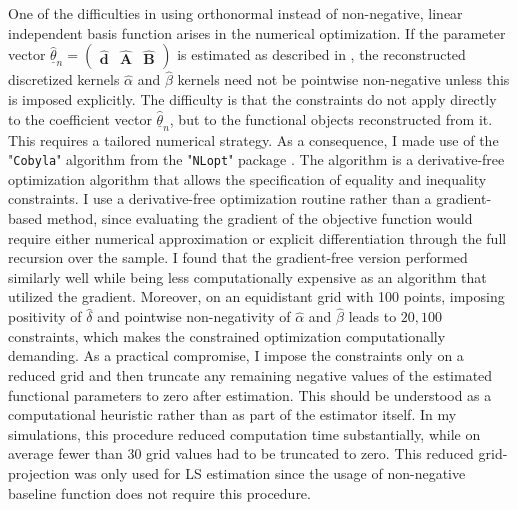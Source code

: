 \documentclass[12pt,a4paper]{article}
\theoremstyle{definition}
\begin{document}
One of the difficulties in using orthonormal instead of non-negative, linear independent basis function arises in the numerical optimization. If the parameter vector $\hat{\underline{\theta}}_n = \begin{pmatrix}
    \mathbf{\hat{d}} & \mathbf{\hat{A}} & \mathbf{\hat{B}}
\end{pmatrix}$ is estimated as described in , the reconstructed discretized kernels $\hat\alpha$ and $\hat\beta$ kernels need not be pointwise non-negative unless this is imposed explicitly. The difficulty is that the constraints do not apply directly to the coefficient vector $\hat{\underline{\theta}}_n$, but to the functional objects reconstructed from it. This requires a tailored numerical strategy. As a consequence, I made use of the "\texttt{Cobyla}" algorithm \citep{CobylaAlgorithm} from the "\texttt{NLopt}" package \citep{NLopt}. The algorithm is a derivative-free optimization algorithm that allows the specification of equality and inequality constraints. I use a derivative-free optimization routine rather than a gradient-based method, since evaluating the gradient of the objective function would require either numerical approximation or explicit differentiation through the full recursion over the sample. I found that the gradient-free version performed similarly well while being less computationally expensive as an algorithm that utilized the gradient. Moreover, on an equidistant grid with 100 points, imposing positivity of $\hat{\delta}$ and pointwise non-negativity of $\hat{\alpha}$ and $\hat{\beta}$ leads to $20,100$ constraints, which makes the constrained optimization computationally demanding. As a practical compromise, I impose the constraints only on a reduced grid and then truncate any remaining negative values of the estimated functional parameters to zero after estimation. This should be understood as a computational heuristic rather than as part of the estimator itself. In my simulations, this procedure reduced computation time substantially, while on average fewer than 30 grid values had to be truncated to zero. This reduced grid-projection was only used for LS estimation since the usage of non-negative baseline function does not require this procedure.
\setlength{\tabcolsep}{5pt}
\end{document}
